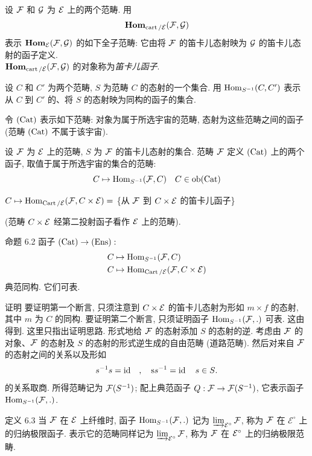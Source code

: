 \subsubsection{}
设 ${\mathcal F}$ 和 ${\mathcal G}$ 为 ${\mathcal E}$ 上的两个范畴.
用
$$
\operatorname{\mathbf{Hom}}_{\operatorname{cart}/{\mathcal E}}({\mathcal F}, {\mathcal G})
$$
表示 $\operatorname{\mathbf{Hom}}_{{\mathcal E}}({\mathcal F},{\mathcal G})$ 的如下全子范畴:
它由将 ${\mathcal F}$ 的笛卡儿态射映为 ${\mathcal G}$ 的笛卡儿态射的函子定义.
\\
$\operatorname{\mathbf{Hom}}_{\operatorname{cart}/{\mathcal E}}({\mathcal F},{\mathcal G})$ 的对象称为\emph{笛卡儿函子}.

设 $C$ 和 $C'$ 为两个范畴, $S$ 为范畴 $C$ 的态射的一个集合.
用 $\operatorname{Hom}_{S^{-1}}(C,C')$ 表示从 $C$ 到 $C'$ 的、将 $S$ 的态射映为同构的函子的集合.

令 $(\operatorname{Cat})$ 表示如下范畴:
对象为属于所选宇宙的范畴, 态射为这些范畴之间的函子
(范畴 $(\operatorname{Cat})$ 不属于该宇宙).

设 ${\mathcal F}$ 为 ${\mathcal E}$ 上的范畴, $S$ 为 ${\mathcal F}$ 的笛卡儿态射的集合.
范畴 ${\mathcal F}$ 定义 $(\operatorname{Cat})$ 上的两个函子,
取值于属于所选宇宙的集合\pageoriginale 的范畴:
$$
C \mapsto \operatorname{Hom}_{S^{-1}}({\mathcal F},C)\quad C \in \operatorname{ob} (\operatorname{Cat})
$$

$C \mapsto \operatorname{Hom}_{\operatorname{Cart} /{\mathcal E}}({\mathcal F},C\times{\mathcal E}) =$ \{从 ${\mathcal F}$ 到 $C\times{\mathcal E}$ 的笛卡儿函子\}

(范畴 $C\times{\mathcal E}$ 经第二投射函子看作 ${\mathcal E}$ 上的范畴).

\begin{enonce*}{命题 6.2}
函子 $(\Cat)\to(\Ens):$
\begin{align*}
C &\mapsto \operatorname{Hom}_{S^{-1}} ({\mathcal F}, C)\\
C &\mapsto \operatorname{Hom}_{\operatorname{Cart}/{\mathcal E}} ({\mathcal F}, C \times {\mathcal E})
\end{align*}
典范同构. 它们可表.
\end{enonce*}

\begin{enonce*}[remark]{证明}
要证明第一个断言, 只须注意到 $C\times{\mathcal E}$ 的笛卡儿态射为形如 $m\times f$ 的态射,
其中 $m$ 为 $C$ 的同构.
要证明第二个断言, 只须证明函子 $\operatorname{Hom}_{S^{-1}}({\mathcal F},.)$ 可表.
这由\cite{sga4.exp.VI.bib.1} 得到. 这里只指出证明思路.
形式地给 ${\mathcal F}$ 的态射添加 $S$ 的态射的逆.
考虑由 ${\mathcal F}$ 的对象、${\mathcal F}$ 的态射及 $S$ 的态射的形式逆生成的自由范畴
(道路范畴).
然后对来自 ${\mathcal F}$ 的态射之间的关系以及形如
$$
s^{-1}s=\operatorname{id}\quad,\quad \text{s}s^{-1}=\operatorname{id}\quad s\in S{}.
$$
的关系取商.
所得范畴记为 ${\mathcal F}(S^{-1})$;
配上典范函子 $Q:\Ff\to\Ff(S^{-1})$, 它表示函子 $\operatorname{Hom}_{S^{-1}}({\mathcal F},.)$.
\end{enonce*}

\begin{enonce*}{定义 6.3}
当 ${\mathcal F}$ 在 ${\mathcal E}$ 上纤维时,
函子 $\operatorname{Hom}_{S^{-1}}({\mathcal F},.)$ 记为 $\varinjlim_{\mathcal{E}^{\circ}}{\mathcal F}$,
称为 ${\mathcal F}$ 在 $\mathcal{E}^{\circ}$ 上的归纳极限函子.
表示它的范畴同样记为 $\varinjlim_{\mathcal{E}^{\circ}}{\mathcal F}$,
称为 ${\mathcal F}$ 在 ${\mathcal E}^{\circ}$ 上的归纳极限范畴.
\end{enonce*}

